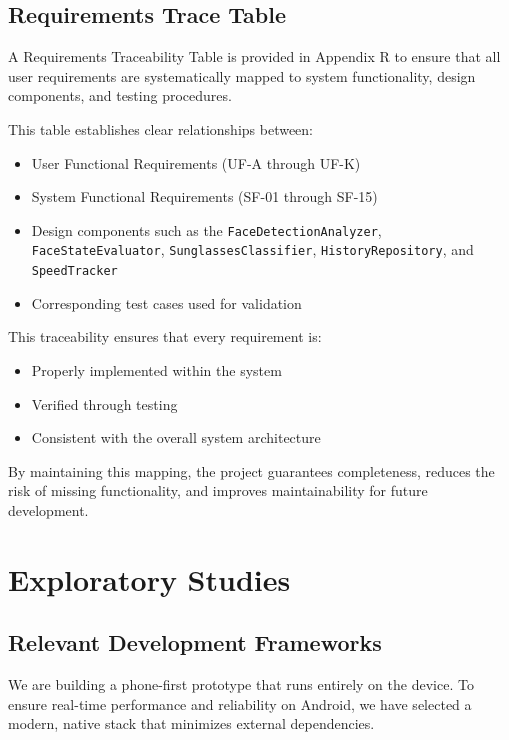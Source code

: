 \documentclass[11pt]{report}
\begin{document}
\section{Requirements Trace Table}

A Requirements Traceability Table is provided in Appendix R to ensure that all user requirements are systematically mapped to system functionality, design components, and testing procedures.

This table establishes clear relationships between:
\begin{itemize}
    \item User Functional Requirements (UF-A through UF-K)
    \item System Functional Requirements (SF-01 through SF-15)
    \item Design components such as the \texttt{FaceDetectionAnalyzer}, \texttt{FaceStateEvaluator}, \texttt{SunglassesClassifier}, \texttt{HistoryRepository}, and \texttt{SpeedTracker}
    \item Corresponding test cases used for validation
\end{itemize}

This traceability ensures that every requirement is:
\begin{itemize}
    \item Properly implemented within the system
    \item Verified through testing
    \item Consistent with the overall system architecture
\end{itemize}

By maintaining this mapping, the project guarantees completeness, reduces the risk of missing functionality, and improves maintainability for future development.

\chapter{Exploratory Studies}\label{ch:exploratory-studies}

\section{Relevant Development Frameworks}\label{sec:frameworks}
We are building a phone-first prototype that runs entirely on the device. To ensure real-time performance and reliability on Android, we have selected a modern, native stack that minimizes external dependencies.
\end{document}
